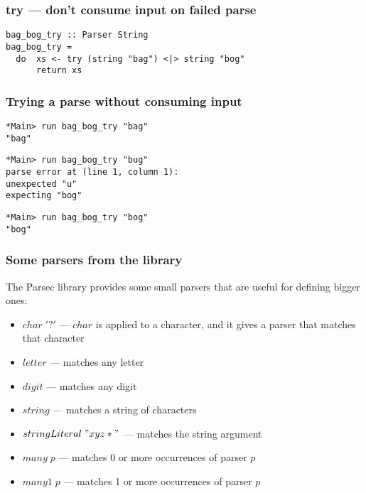 \documentclass{beamer}
\begin{document}
\begin{frame}[fragile]
\frametitle{try --- don't consume input on failed parse}

\begin{verbatim}
bag_bog_try :: Parser String
bag_bog_try =
  do  xs <- try (string "bag") <|> string "bog"
      return xs
\end{verbatim}

\end{frame}

\begin{frame}[fragile]
\frametitle{Trying a parse without consuming input}

{\footnotesize
\begin{verbatim}
*Main> run bag_bog_try "bag"
"bag"
\end{verbatim}
}

{\footnotesize
\begin{verbatim}
*Main> run bag_bog_try "bug"
parse error at (line 1, column 1):
unexpected "u"
expecting "bog"
\end{verbatim}
}

{\footnotesize
\begin{verbatim}
*Main> run bag_bog_try "bog"
"bog"
\end{verbatim}
}

\end{frame}


\begin{frame}[fragile]
\frametitle{Some parsers from the library}

The Parsec library provides some  small parsers that are useful for
defining bigger ones:

\begin{itemize}
\item $char\; '?'$ --- $char$ is applied to a character, and it gives a
  parser that matches that character  
\item $letter$ --- matches any letter
\item $digit$ --- matches any digit
\item $string$ --- matches a string of characters
\item $stringLiteral\; "xyz*"$ --- matches the string argument
\item $many\; p$ --- matches 0 or more occurrences of parser $p$
\item $many1\; p$ --- matches 1 or more occurrences of parser $p$
\end{itemize}

\end{frame}
\end{document}
